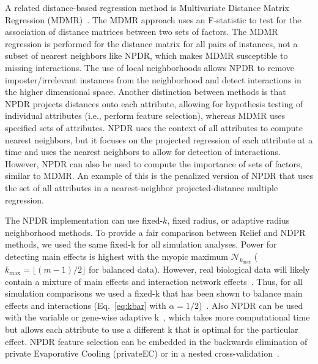\documentclass{bioinfo}
\begin{document}
A related distance-based regression method is Multivariate Distance Matrix Regression (MDMR)~\citep{schork12}.
The MDMR approach uses an F-statistic to test for the association of distance matrices between two sets of factors.
The MDMR regression is performed for the distance matrix for all pairs of instances, not a subset of nearest neighbors like NPDR, which makes MDMR susceptible to missing interactions.
The use of local neighborhoods allows NPDR to remove imposter/irrelevant instances from the neighborhood and detect interactions in the higher dimensional space.
Another distinction between methods is that NPDR projects distances onto each attribute, allowing for hypothesis testing of individual attributes (i.e., perform feature selection), whereas MDMR uses specified sets of attributes.
NPDR uses the context of all attributes to compute nearest neighbors, but it focuses on the projected regression of each attribute at a time and uses the nearest neighbors to allow for detection of interactions. However, NPDR can also be used to compute the importance of sets of factors, similar to MDMR.
An example of this is the penalized version of NPDR that uses the set of all attributes in a nearest-neighbor projected-distance multiple regression.

The NPDR implementation can use fixed-$k$, fixed radius, or adaptive radius neighborhood methods. To provide a fair comparison between Relief and NDPR methods, we used the same fixed-k for all simulation analyses.
Power for detecting main effects is highest with the myopic maximum $\mathcal{N}_{k_\text{max}}$ ($k_{\text{max}}=\lfloor (m-1)/2\rfloor$ for balanced data).
However, real biological data will likely contain a mixture of main effects and interaction network effects~\citep{mckinney_pajewski}. Thus, for all simulation comparisons we used a fixed-k that has been shown to balance main effects and interactions (Eq.~\ref{eq:kbar} with $\alpha=1/2$)~\citep{stir}. Also NPDR can be used with the variable or gene-wise adaptive k~\citep{mckinney13}, which takes more computational time but allows each attribute to use a different k that is optimal for the particular effect. 
NPDR feature selection can be embedded in the backwards elimination of private Evaporative Cooling (privateEC) or in a nested cross-validation~\citep{le17}.
\end{document}
